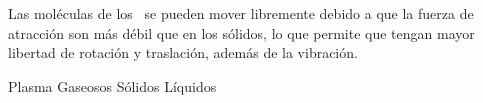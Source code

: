 
\question Las moléculas de los \fillin\ se pueden mover libremente debido a
  que la fuerza de atracción son más débil que en los sólidos, lo que permite
  que tengan mayor libertad de rotación y traslación, además de la vibración.

  \begin{oneparchoices}
    \choice Plasma
    \choice Gaseosos
    \choice Sólidos
    \CorrectChoice Líquidos
  \end{oneparchoices}
  \answerline[D]
